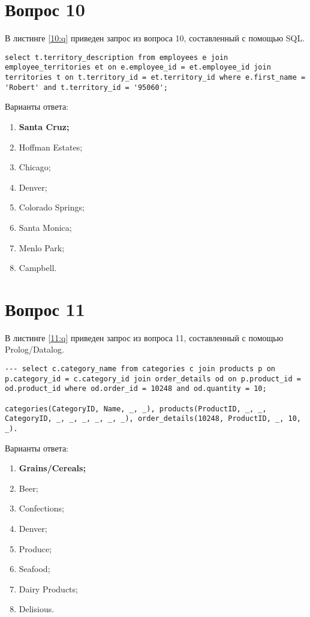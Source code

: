 \begin{appendices}
\section{Вопрос 10}

В листинге \ref{10:q} приведен запрос из вопроса 10, составленный с помощью SQL.

\begin{lstlisting}[label=10:q,caption=Вопрос 10]
select t.territory_description from employees e join employee_territories et on e.employee_id = et.employee_id join territories t on t.territory_id = et.territory_id where e.first_name = 'Robert' and t.territory_id = '95060';
\end{lstlisting}

Варианты ответа:

\begin{enumerate}
	\item \textbf{Santa Cruz;}
	\item Hoffman Estates;
	\item Chicago;
	\item Denver;
	\item Colorado Springs;
	\item Santa Monica;
	\item Menlo Park;
	\item Campbell.
\end{enumerate}

\section{Вопрос 11}

В листинге \ref{11:q} приведен запрос из вопроса 11, составленный с помощью Prolog/Datalog.

\begin{lstlisting}[label=11:q,caption=Вопрос 11]
--- select c.category_name from categories c join products p on p.category_id = c.category_id join order_details od on p.product_id = od.product_id where od.order_id = 10248 and od.quantity = 10;

categories(CategoryID, Name, _, _), products(ProductID, _, _, CategoryID, _, _, _, _, _, _), order_details(10248, ProductID, _, 10, _).
\end{lstlisting}

Варианты ответа:

\begin{enumerate}
	\item \textbf{Grains/Cereals;}
	\item Beer;
	\item Confections;
	\item Denver;
	\item Produce;
	\item Seafood;
	\item Dairy Products;
	\item Delisious.
\end{enumerate}


\end{appendices}
